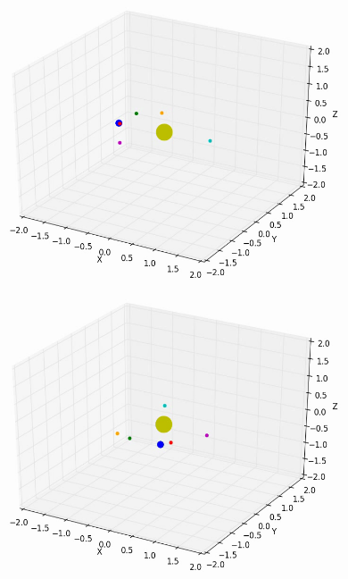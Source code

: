 \documentclass[10pt,letterpaper]{article}
\begin{document}
\begin{figure}[!htb]
  \includegraphics[width=\linewidth]{figures/lagrange_points/lagrange_points_l2_vx_01_1.png}
  \subcaption{}\label{fig:lagrange_points_l2_vx_01_fig1}
\endminipage\hfill
{}
  \includegraphics[width=\linewidth]{figures/lagrange_points/lagrange_points_l2_vx_01_2.png}
  \subcaption{}\label{fig:lagrange_points_l2_vx_01_fig2}
\endminipage\hfill
{}%

\end{figure}
\end{document}
